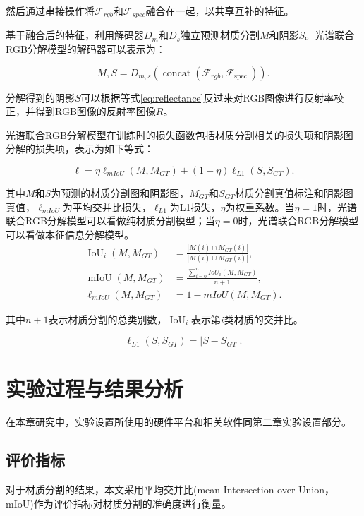\documentclass[
    type = master, %
    degree = academic,        %
    decl-page,  %
  ]{njuthesis}
\begin{document}
然后通过串接操作将$\mathcal{F}_{r g b}$和$\mathcal{F}_{spec}$融合在一起，以共享互补的特征。

基于融合后的特征，利用解码器$D_{m}$和$D_{s}$独立预测材质分割$M$和阴影$S$。光谱联合RGB分解模型的解码器可以表示为：

\begin{equation}
M, S=D_{m,s}\left(\operatorname{concat}\left(\mathcal{F}_{r g b}, \mathcal{F}_{\text {spec }}\right)\right).
\end{equation}

分解得到的阴影$S$可以根据等式\ref{eq:reflectance}反过来对RGB图像进行反射率校正，并得到RGB图像的反射率图像$R$。

光谱联合RGB分解模型在训练时的损失函数包括材质分割相关的损失项和阴影图分解的损失项，表示为如下等式：

\begin{equation}
\ell  = \eta \ell_{mIoU}(M,M_{GT}) + (1-\eta) {\ell
_{L1}(S,S_{GT})}.
\end{equation}

其中$M$和$S$为预测的材质分割图和阴影图，$M_{GT}$和$S_{GT}$材质分割真值标注和阴影图真值，$\ell_{mIoU}$为平均交并比损失，$\ell
_{L1}$为L1损失，$\eta$为权重系数。当$\eta=1$时，光谱联合RGB分解模型可以看做纯材质分割模型；当$\eta=0$时，光谱联合RGB分解模型可以看做本征信息分解模型。
\begin{equation}
\begin{align}
\operatorname{IoU}_i(M,M_{GT}) &= \frac{|M(i) \cap M_{GT}(i)|}{|M(i) \cup M_{GT}(i)|},\\
\operatorname{mIoU}(M,M_{GT}) &= \frac{\sum_{i=0}^{n} 
 IoU_i(M,M_{GT})}{n+1},\\
    \ell_{mIoU}(M,M_{GT}) &= 1 - mIoU(M,M_{GT}).
\end{align}
\end{equation}

其中$n+1$表示材质分割的总类别数，$\operatorname{IoU}_i$表示第$i$类材质的交并比。

\begin{equation}
\ell_{L1}(S,S_{GT}) = | S - S_{GT}|.
\end{equation}



\section{实验过程与结果分析}
在本章研究中，实验设置所使用的硬件平台和相关软件同第二章实验设置部分。
\subsection{评价指标}
对于材质分割的结果，本文采用平均交并比(mean Intersection-over-Union，mIoU)作为评价指标对材质分割的准确度进行衡量。
\end{document}

